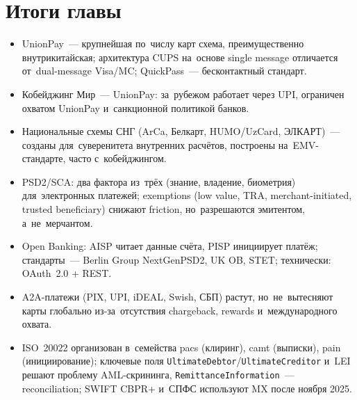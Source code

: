 \section*{Итоги главы}

\begin{itemize}
  \item UnionPay~--- крупнейшая по~числу карт схема, преимущественно
        внутрикитайская; архитектура CUPS на~основе single message отличается
        от~dual-message Visa/MC; QuickPass~--- бесконтактный стандарт.
  \item Кобейджинг Мир~--- UnionPay: за~рубежом работает через UPI,
        ограничен охватом UnionPay и~санкционной политикой банков.
  \item Национальные схемы СНГ (ArCa, Белкарт, HUMO/UzCard,
        ЭЛКАРТ)~--- созданы для~суверенитета внутренних расчётов,
        построены на~EMV-стандарте, часто с~кобейджингом.
  \item PSD2/SCA: два фактора из~трёх (знание, владение, биометрия)
        для~электронных платежей; exemptions (low value, TRA,
        merchant-initiated, trusted beneficiary) снижают friction,
        но~разрешаются эмитентом, а~не~мерчантом.
  \item Open Banking: AISP читает данные счёта, PISP инициирует
        платёж; стандарты~--- Berlin Group NextGenPSD2, UK OB, STET;
        технически: OAuth~2.0 + REST.
  \item A2A-платежи (PIX, UPI, iDEAL, Swish, СБП) растут,
        но~не~вытесняют карты глобально из-за~отсутствия chargeback,
        rewards и~международного охвата.
  \item ISO~20022 организован в~семейства pacs (клиринг), camt (выписки),
        pain (инициирование); ключевые поля \texttt{UltimateDebtor}/\texttt{UltimateCreditor}
        и~LEI решают проблему AML-скрининга, \texttt{RemittanceInformation}~---
        reconciliation; SWIFT CBPR+ и~СПФС используют MX после ноября 2025.
\end{itemize}
